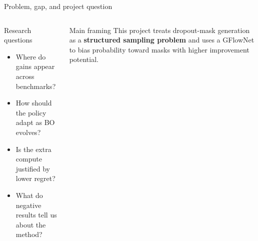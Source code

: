 \documentclass[aspectratio=169]{beamer}
\begin{document}
\begin{frame}{Problem, gap, and project question}
\begin{columns}[T,onlytextwidth]
\begin{minipage}[t][0.82\textheight]{\linewidth}
  \vfill

  \begin{card}{Research questions}
  \begin{itemize}
    \item Where do gains appear across benchmarks?
    \item How should the policy adapt as BO evolves?
    \item Is the extra compute justified by lower regret?
    \item What do negative results tell us about the method?
  \end{itemize}
  \end{card}

  \vfill

  \begin{card}{Main framing}
  This project treats dropout-mask generation as a \textbf{structured sampling problem} and uses a GFlowNet to bias probability toward masks with higher improvement potential.
  \end{card}
\end{minipage}
\end{columns}
\end{frame}
\end{document}
